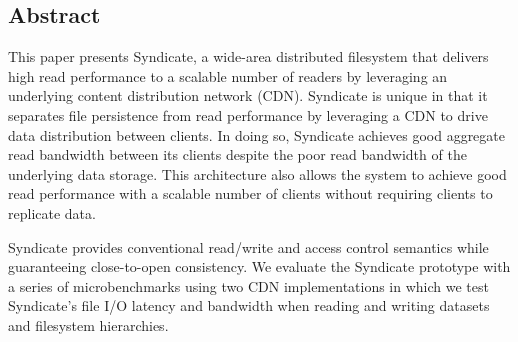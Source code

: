 \subsection*{Abstract}

This paper presents Syndicate, a wide-area distributed filesystem that
delivers high read performance to a scalable number of readers by
leveraging an underlying content distribution network (CDN).
Syndicate is unique in that it separates file persistence from
read performance by leveraging a CDN to drive data distribution
between clients.  In doing so, Syndicate achieves good aggregate
read bandwidth between its clients despite the poor read bandwidth of 
the underlying data storage.  This architecture also allows the system
to achieve good read performance with a scalable number of clients without
requiring clients to replicate data.

Syndicate provides
conventional read/write and access control semantics while guaranteeing
close-to-open consistency. We evaluate the Syndicate prototype with a series of
microbenchmarks using two CDN implementations in which we test Syndicate's
file I/O latency and bandwidth when reading and writing datasets 
and filesystem hierarchies.

